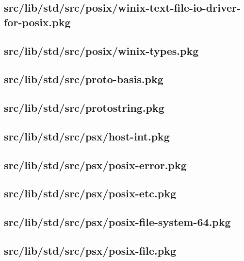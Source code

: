 \subsection{src/lib/std/src/posix/winix-text-file-io-driver-for-posix.pkg}


\subsection{src/lib/std/src/posix/winix-types.pkg}


\subsection{src/lib/std/src/proto-basis.pkg}


\subsection{src/lib/std/src/protostring.pkg}


\subsection{src/lib/std/src/psx/host-int.pkg}


\subsection{src/lib/std/src/psx/posix-error.pkg}


\subsection{src/lib/std/src/psx/posix-etc.pkg}


\subsection{src/lib/std/src/psx/posix-file-system-64.pkg}


\subsection{src/lib/std/src/psx/posix-file.pkg}


